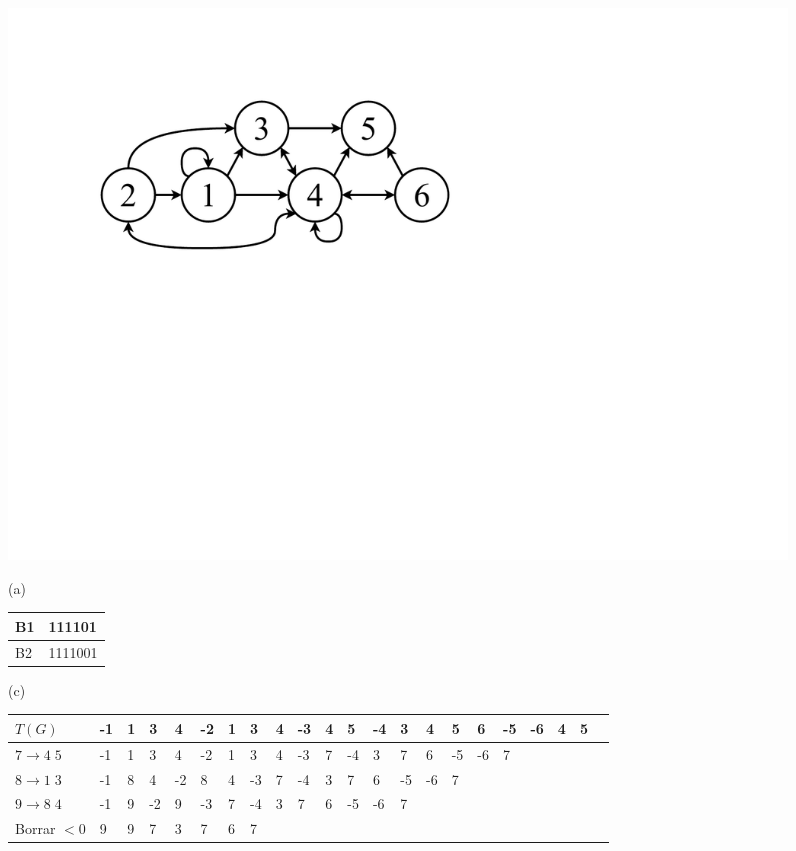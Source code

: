 \begin{figure}%
    	\centering
    	\begin{minipage}{1\textwidth}
    		\begin{minipage}{.6\textwidth}
    			\centering
    			\includegraphics[scale=.4, clip,  trim=100 330 300 0]{img/arte/graphs-repair.pdf}
    		
    			(a)
    		\end{minipage}
    		\begin{minipage}{.35\textwidth}
    			\centering
    			\vspace{20mm}
		    	\begin{tabular}{|l|l|}
		    		\hline
		    		B1 & 111101 \\
		    		\hline
		    		B2 & 1111001\\
		    		\hline
		    	\end{tabular}
		    	\vspace{5mm}
		    	
    			(c)
    		\end{minipage}
    	\end{minipage}
    	\vspace{5mm}
    	
    	\begin{minipage}{1\textwidth}
    		\centering

		\begin{tabular}{l||l|l|l|l|l|l|l|l|l|l|l|l|l|l|l|l|l|l|l|l|l|}
			\toprule
			$T(G)$ & -1 & 1 & 3 & 4 & -2 & 1 & 3 & 4 & -3 & 4 & 5 & -4 & 3 & 4 & 5 & 6 & -5 & -6 & 4 & 5 \\
			\midrule
			$7 \rightarrow 4 \; 5$ & -1 & 1 & 3 & 4 & -2 & 1 & 3 & 4 & -3 & 7 & -4 & 3 & 7 & 6 & -5 & -6 & 7 \\
			\cline{1-18}
			$8 \rightarrow 1 \; 3$ & -1 & 8 & 4 & -2 & 8 & 4 & -3 & 7 & -4 & 3 & 7 & 6 & -5 & -6 & 7 \\
			\cline{1-16}
			$9 \rightarrow 8 \; 4$ & -1 & 9 & -2 & 9 & -3 & 7 & -4 & 3 & 7 & 6 & -5 & -6 & 7 \\
			\cline{1-14}
			Borrar $<0$ & 9 & 9 & 7 & 3 & 7 & 6 & 7 \\
			\cline{1-8}
		\end{tabular}				
		\vspace{5mm}
		

\end{minipage}
\end{figure}
